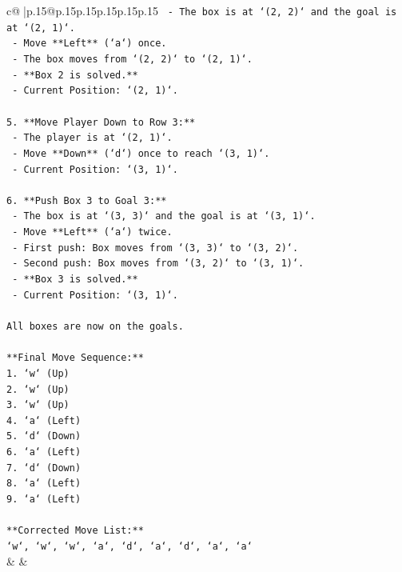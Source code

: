 \documentclass{article}
\begin{document}
{\begin{supertabular}{c@{$\;$}|p{.15\linewidth}@{}p{.15\linewidth}p{.15\linewidth}p{.15\linewidth}p{.15\linewidth}p{.15\linewidth}}
{{{\texttt{    {-} The box is at `(2, 2)` and the goal is at `(2, 1)`.} \\
\texttt{    {-} Move **Left** (`a`) once.} \\
\texttt{    {-} The box moves from `(2, 2)` to `(2, 1)`.} \\
\texttt{    {-} **Box 2 is solved.**} \\
\texttt{    {-} Current Position: `(2, 1)`.} \\
\\ 
\texttt{5.  **Move Player Down to Row 3:**} \\
\texttt{    {-} The player is at `(2, 1)`.} \\
\texttt{    {-} Move **Down** (`d`) once to reach `(3, 1)`.} \\
\texttt{    {-} Current Position: `(3, 1)`.} \\
\\ 
\texttt{6.  **Push Box 3 to Goal 3:**} \\
\texttt{    {-} The box is at `(3, 3)` and the goal is at `(3, 1)`.} \\
\texttt{    {-} Move **Left** (`a`) twice.} \\
\texttt{    {-} First push: Box moves from `(3, 3)` to `(3, 2)`.} \\
\texttt{    {-} Second push: Box moves from `(3, 2)` to `(3, 1)`.} \\
\texttt{    {-} **Box 3 is solved.**} \\
\texttt{    {-} Current Position: `(3, 1)`.} \\
\\ 
\texttt{All boxes are now on the goals.} \\
\\ 
\texttt{**Final Move Sequence:**} \\
\texttt{1.  `w` (Up)} \\
\texttt{2.  `w` (Up)} \\
\texttt{3.  `w` (Up)} \\
\texttt{4.  `a` (Left)} \\
\texttt{5.  `d` (Down)} \\
\texttt{6.  `a` (Left)} \\
\texttt{7.  `d` (Down)} \\
\texttt{8.  `a` (Left)} \\
\texttt{9.  `a` (Left)} \\
\\ 
\texttt{**Corrected Move List:**} \\
\texttt{`w`, `w`, `w`, `a`, `d`, `a`, `d`, `a`, `a`} \\
            }
        }
    }
    & & \\ \\


\end{supertabular}}
\end{document}
